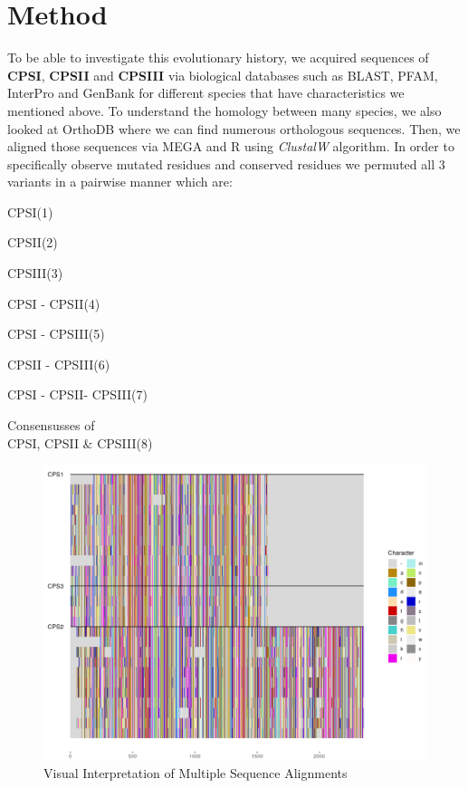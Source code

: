 \documentclass[a4paper]{article}
\begin{document}
\section{Method}
To be able to investigate this evolutionary history, we acquired sequences of \textbf{CPSI}, \textbf{CPSII} and \textbf{CPSIII} via biological databases such as BLAST, PFAM, InterPro and GenBank for different species that have characteristics we mentioned above. To understand the homology between many species, we also looked at OrthoDB where we can find numerous orthologous sequences. Then, we aligned those sequences via MEGA and R using \textit{ClustalW} algorithm. In order to specifically observe mutated residues and conserved residues we permuted all 3 variants in a pairwise manner which are:

\begin{itemize}
\begin{multicols}{3}
    \item CPSI(1)
    \item CPSII(2)
    \item CPSIII(3)
    \columnbreak
    \item CPSI - CPSII(4)
    \item CPSI - CPSIII(5)
    \item CPSII - CPSIII(6)
    \columnbreak
    \item CPSI - CPSII- CPSIII(7)
    \item Consensusses of \\ CPSI, CPSII \& CPSIII(8)
    \end{multicols}
\end{itemize}

\begin{figure}[H]
\begin{center}
\includegraphics[width=\textwidth]{draw_aline.png}
\end{center}
\caption{Visual Interpretation of Multiple Sequence Alignments}
\label{fig:visual}
\end{figure}
\end{document}
